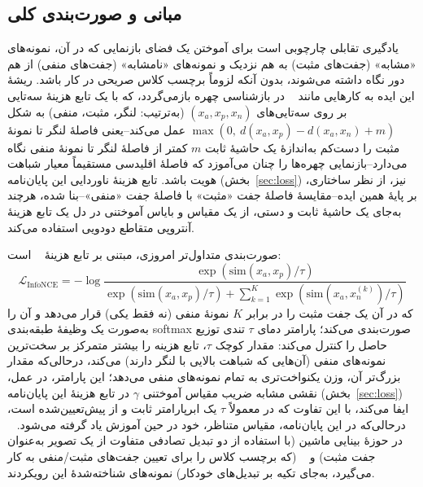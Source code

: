 \subsection{مبانی و صورت‌بندی کلی}
یادگیری تقابلی
چارچوبی است برای آموختن یک فضای بازنمایی که در آن، نمونه‌های «مشابه» (جفت‌های مثبت) به هم نزدیک و نمونه‌های «نامشابه» (جفت‌های منفی) از هم دور نگاه داشته می‌شوند، بدون آنکه لزوماً برچسب کلاس صریحی در کار باشد. ریشهٔ این ایده به کارهایی مانند
~\cite{schroff2015facenet}
در بازشناسی چهره بازمی‌گردد، که با یک تابع هزینهٔ سه‌تایی
بر روی سه‌تایی‌های
$(x_a, x_p, x_n)$
(به‌ترتیب: لنگر، مثبت، منفی) به شکل
$\max(0,\ d(x_a,x_p) - d(x_a,x_n) + m)$
عمل می‌کند--یعنی فاصلهٔ لنگر تا نمونهٔ مثبت را دست‌کم به‌اندازهٔ یک حاشیهٔ
ثابت
$m$
کمتر از فاصلهٔ لنگر تا نمونهٔ منفی نگاه می‌دارد--بازنمایی چهره‌ها را چنان می‌آموزد که فاصلهٔ اقلیدسی مستقیماً معیار شباهت هویت باشد. تابع هزینهٔ ناوردایی این پایان‌نامه (بخش~\ref{sec:loss}) نیز، از نظر ساختاری، بر پایهٔ همین ایده--مقایسهٔ فاصلهٔ جفت «مثبت» با فاصلهٔ جفت «منفی»--بنا شده، هرچند به‌جای یک حاشیهٔ ثابت و دستی، از یک مقیاس و بایاس آموختنی در دل یک تابع هزینهٔ آنتروپی متقاطع دودویی استفاده می‌کند.

صورت‌بندی متداول‌تر امروزی، مبتنی بر تابع هزینهٔ
~\cite{oord2018cpc}
است:
\begin{equation}
\mathcal{L}_{\mathrm{InfoNCE}} = -\log \frac{\exp(\mathrm{sim}(x_a, x_p)/\tau)}{\exp(\mathrm{sim}(x_a, x_p)/\tau) + \sum_{k=1}^{K}\exp(\mathrm{sim}(x_a, x_n^{(k)})/\tau)}
\end{equation}
که در آن یک جفت مثبت را در برابر
$K$
نمونهٔ منفی (نه فقط یکی) قرار می‌دهد و آن را به‌صورت یک وظیفهٔ طبقه‌بندی softmax صورت‌بندی می‌کند؛ پارامتر دمای
$\tau$
تندی توزیع حاصل را کنترل می‌کند: مقدار کوچک
$\tau$، تابع هزینه را بیشتر متمرکز بر سخت‌ترین نمونه‌های منفی (آن‌هایی که شباهت بالایی با لنگر دارند) می‌کند، درحالی‌که مقدار بزرگ‌تر آن، وزن یکنواخت‌تری به تمام نمونه‌های منفی می‌دهد؛ این پارامتر، در عمل، نقشی مشابه ضریب مقیاس آموختنی
$\gamma$
در تابع هزینهٔ این پایان‌نامه (بخش~\ref{sec:loss}) ایفا می‌کند، با این تفاوت که در
معمولاً
$\tau$
یک ابرپارامتر ثابت و از پیش‌تعیین‌شده است، درحالی‌که در این پایان‌نامه، مقیاس متناظر، خود در حین آموزش یاد گرفته می‌شود.
~\cite{chen2020simclr}
در حوزهٔ بینایی ماشین (با استفاده از دو تبدیل تصادفی متفاوت از یک تصویر به‌عنوان جفت مثبت) و
~\cite{khosla2020supcon}
(که برچسب کلاس را برای تعیین جفت‌های مثبت/منفی به کار می‌گیرد، به‌جای تکیه بر تبدیل‌های خودکار) نمونه‌های شناخته‌شدهٔ این رویکردند.

